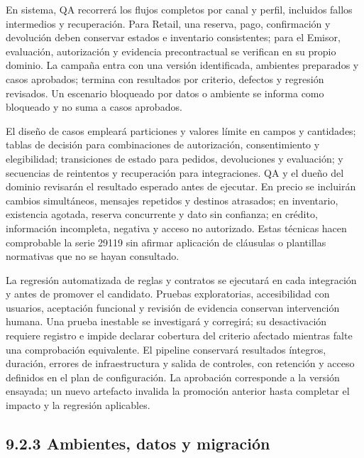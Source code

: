 \documentclass[11pt]{article}
\begin{document}
En sistema, QA recorrerá los flujos completos por canal y perfil, incluidos fallos intermedios y recuperación. Para Retail, una reserva, pago, confirmación y devolución deben conservar estados e inventario consistentes; para el Emisor, evaluación, autorización y evidencia precontractual se verifican en su propio dominio. La campaña entra con una versión identificada, ambientes preparados y casos aprobados; termina con resultados por criterio, defectos y regresión revisados. Un escenario bloqueado por datos o ambiente se informa como bloqueado y no suma a casos aprobados.

El diseño de casos empleará particiones y valores límite en campos y cantidades; tablas de decisión para combinaciones de autorización, consentimiento y elegibilidad; transiciones de estado para pedidos, devoluciones y evaluación; y secuencias de reintentos y recuperación para integraciones. QA y el dueño del dominio revisarán el resultado esperado antes de ejecutar. En precio se incluirán cambios simultáneos, mensajes repetidos y destinos atrasados; en inventario, existencia agotada, reserva concurrente y dato sin confianza; en crédito, información incompleta, negativa y acceso no autorizado. Estas técnicas hacen comprobable la serie 29119 sin afirmar aplicación de cláusulas o plantillas normativas que no se hayan consultado.

La regresión automatizada de reglas y contratos se ejecutará en cada integración y antes de promover el candidato. Pruebas exploratorias, accesibilidad con usuarios, aceptación funcional y revisión de evidencia conservan intervención humana. Una prueba inestable se investigará y corregirá; su desactivación requiere registro e impide declarar cobertura del criterio afectado mientras falte una comprobación equivalente. El pipeline conservará resultados íntegros, duración, errores de infraestructura y salida de controles, con retención y acceso definidos en el plan de configuración. La aprobación corresponde a la versión ensayada; un nuevo artefacto invalida la promoción anterior hasta completar el impacto y la regresión aplicables.

\subsection{9.2.3 Ambientes, datos y migración}
\end{document}
